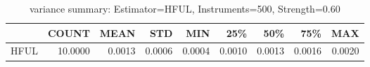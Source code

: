 \begin{table}[ht]
\centering
\caption{variance summary: Estimator=HFUL, Instruments=500, Strength=0.60}
\begin{tabular}{lrrrrrrrr}
\toprule
 & COUNT & MEAN & STD & MIN & 25\% & 50\% & 75\% & MAX \\
\midrule
HFUL & 10.0000 & 0.0013 & 0.0006 & 0.0004 & 0.0010 & 0.0013 & 0.0016 & 0.0020 \\
\bottomrule
\end{tabular}
\end{table}
